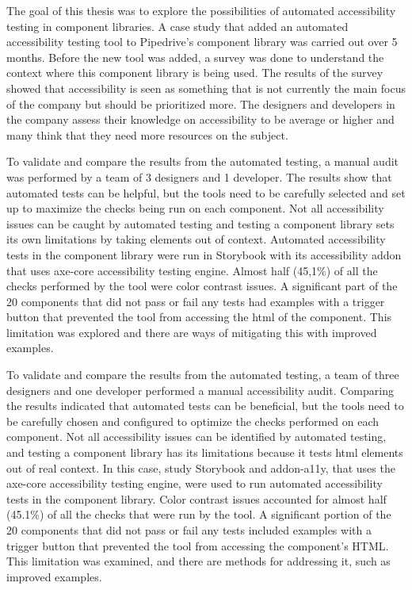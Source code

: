 \documentclass{master_thesis}
\begin{document}
The goal of this thesis was to explore the possibilities of automated accessibility testing in component libraries. A case study that added an automated accessibility testing tool to Pipedrive's component library was carried out over 5 months.  Before the new tool was added, a survey was done to understand the context where this component library is being used. The results of the survey showed that accessibility is seen as something that is not currently the main focus of the company but should be prioritized more. The designers and developers in the company assess their knowledge on accessibility to be average or higher and many think that they need more resources on the subject.

To validate and compare the results from the automated testing, a manual audit was performed by a team of 3 designers and 1 developer. The results show that automated tests can be helpful, but the tools need to be carefully selected and set up to maximize the checks being run on each component. Not all accessibility issues can be caught by automated testing and testing a component library sets its own limitations by taking elements out of context. Automated accessibility tests in the component library were run in Storybook with its accessibility addon that uses axe-core accessibility testing engine. Almost half (45,1\%) of all the checks performed by the tool were color contrast issues. A significant part of the 20 components that did not pass or fail any tests had examples with a trigger button that prevented the tool from accessing the \ac{html} of the component. This limitation was explored and there are ways of mitigating this with improved examples.

To validate and compare the results from the automated testing, a team of three designers and one developer performed a manual accessibility audit. Comparing the results indicated that automated tests can be beneficial, but the tools need to be carefully chosen and configured to optimize the checks performed on each component. Not all accessibility issues can be identified by automated testing, and testing a component library has its limitations because it tests \ac{html} elements out of real context. In this case, study Storybook and addon-a11y, that uses the axe-core accessibility testing engine, were used to run automated accessibility tests in the component library. Color contrast issues accounted for almost half (45.1\%) of all the checks that were run by the tool. A significant portion of the 20 components that did not pass or fail any tests included examples with a trigger button that prevented the tool from accessing the component's HTML. This limitation was examined, and there are methods for addressing it, such as improved examples.
\end{document}
